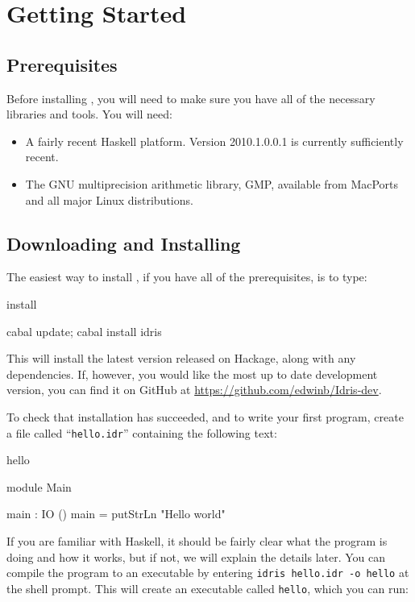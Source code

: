 \section{Getting Started}

\subsection{Prerequisites} 

Before installing \Idris{}, you will need to make sure you have all of the necessary
libraries and tools. You will need:

\begin{itemize}
\item A fairly recent Haskell platform. Version 2010.1.0.0.1 is currently
sufficiently recent.
\item The GNU multiprecision arithmetic library, GMP, available from MacPorts and
all major Linux distributions.
\end{itemize}

\subsection{Downloading and Installing}

The easiest way to install \Idris{}, if you have all of the prerequisites, is to type:

\begin{SaveVerbatim}{install}

cabal update; cabal install idris

\end{SaveVerbatim}

\noindent
This will install the latest version released on Hackage, along with any dependencies. 
If, however, you would like the most up
to date development version, you can find it on GitHub at
\url{https://github.com/edwinb/Idris-dev}.

To check that installation has succeeded, and to write your first \Idris{}
program, create a file called ``\texttt{hello.idr}'' containing the following
text:

\begin{SaveVerbatim}{hello}

module Main

main : IO ()
main = putStrLn "Hello world"

\end{SaveVerbatim}

\noindent
If you are familiar with Haskell, it should be fairly clear what the program is doing
and how it works, but if not, we will explain the details later.
You can compile the program to an executable by entering \texttt{idris hello.idr -o hello}
at the shell prompt. This will create an executable called \texttt{hello}, which you can run:

